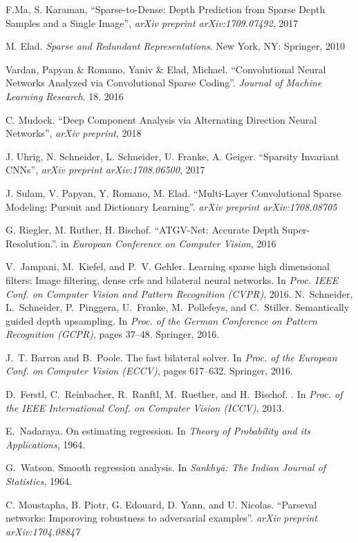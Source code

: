 \begin{thebibliography}{99}
  F.Ma, S. Karaman, ``Sparse-to-Dense: Depth Prediction from Sparse Depth Samples and a Single Image'', \emph{arXiv preprint arXiv:1709.07492}, 2017
  
  M. Elad. \emph{Sparse and Redundant Representations}. New York, NY: Springer, 2010

  Vardan, Papyan \& Romano, Yaniv \& Elad, Michael. ``Convolutional Neural Networks Analyzed via Convolutional Sparse Coding''. \emph{Journal of Machine Learning Research}. 18. 2016

  C. Mudock. ``Deep Component Analysis via Alternating Direction Neural Networks'', \emph{arXiv preprint}, 2018

  J. Uhrig, N. Schneider, L. Schneider, U. Franke, A. Geiger. ``Sparsity Invariant CNNs'', \emph{arXiv preprint arXiv:1708.06500}, 2017

  J. Sulam, V. Papyan, Y. Romano, M. Elad. ``Multi-Layer Convolutional Sparse Modeling: Pursuit and Dictionary Learning''. \emph{arXiv preprint arXiv:1708.08705}

  G. Riegler, M. Ruther, H. Bischof. ``ATGV-Net: Accurate Depth Super-Resolution.''. in \emph{European Conference on Computer Vision}, 2016

  V.~Jampani, M.~Kiefel, and P.~V. Gehler.
  \newblock Learning sparse high dimensional filters: Image filtering, dense crfs
  and bilateral neural networks.
  \newblock In {\em Proc. IEEE Conf. on Computer Vision and Pattern Recognition
    (CVPR)}, 2016.
  N.~Schneider, L.~Schneider, P.~Pinggera, U.~Franke, M.~Pollefeys, and
  C.~Stiller.
  \newblock Semantically guided depth upsampling.
  \newblock In {\em Proc. of the German Conference on Pattern Recognition
    (GCPR)}, pages 37--48. Springer, 2016.

J.~T. Barron and B.~Poole.
\newblock The fast bilateral solver.
\newblock In {\em Proc. of the European Conf. on Computer Vision (ECCV)}, pages
  617--632. Springer, 2016.

D.~Ferstl, C.~Reinbacher, R.~Ranftl, M.~Ruether, and H.~Bischof.
.
\newblock In {\em Proc. of the IEEE International Conf. on Computer Vision
  (ICCV)}, 2013.

E.~Nadaraya.
\newblock On estimating regression.
\newblock In {\em Theory of Probability and its Applications}, 1964.

G.~Watson.
\newblock Smooth regression analysis.
\newblock In {\em Sankhyā: The Indian Journal of Statistics}, 1964.

  C. Moustapha, B. Piotr, G. Edouard, D. Yann, and U. Nicolas. ``Parseval networks: Imporoving robustness to adversarial examples''. \emph{arXiv preprint arXiv:1704.08847}
\end{thebibliography}